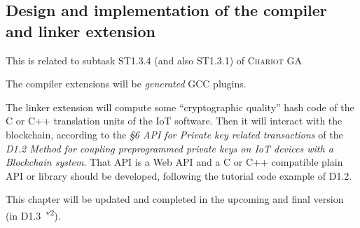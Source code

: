\subsection{Design and implementation of the compiler and linker extension}

\label{subsec:compilinkext}
This is related to subtask ST1.3.4 (and also ST1.3.1) of \textsc{Chariot} GA 

The compiler extensions will be \emph{generated} GCC plugins.

The linker extension will compute some ``cryptographic quality'' hash
code of the C or C++ translation units of the IoT software. Then it
will interact with the blockchain, according to the \emph{\S 6 API for
  Private key related transactions} of the \emph{D1.2 Method for
  coupling preprogrammed private keys on IoT devices with a Blockchain
  system}. That API is a Web API and a C or C++ compatible plain API
or library should be developed, following the tutorial code example of
D1.2.

This chapter will be updated and completed in the upcoming and final
version (in D1.3~\textsuperscript{v2}).


